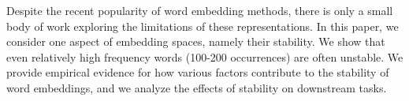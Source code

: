 Despite the recent popularity of word embedding methods, there is only a small body of work exploring the limitations of these representations. In this paper, we consider one aspect of embedding spaces, namely their stability. We show that even relatively high frequency words (100-200 occurrences) are often unstable. We provide empirical evidence for how various factors contribute to the stability of word embeddings, and we analyze the effects of stability on downstream tasks.
